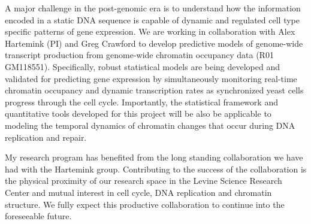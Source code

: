 
A major challenge in the post-genomic era is to understand how the information encoded in a static DNA sequence is capable of dynamic and regulated cell type specific patterns of gene expression. We are working in collaboration  with Alex Hartemink (PI) and Greg Crawford to develop predictive models of genome-wide transcript production from genome-wide chromatin occupancy data (R01 GM118551). %
Specifically, robust statistical models are being developed and validated for predicting gene expression by simultaneously monitoring real-time chromatin occupancy and dynamic transcription rates as synchronized yeast cells progress through the cell cycle\citep{Orlando2008-jq}.  Importantly, the statistical framework and quantitative tools developed for this project will be also be applicable to modeling the temporal dynamics of chromatin changes that occur during DNA replication and repair.

My research program has benefited from the long standing collaboration we have had with the Hartemink group\citep{MacAlpine2010-ju,Belsky2015-li}.  Contributing to the success of the collaboration is the physical proximity of our research space in the Levine Science Research Center and mutual interest in cell cycle, DNA replication and chromatin structure.  We fully expect this productive collaboration to continue into the foreseeable future. 

\pagebreak




